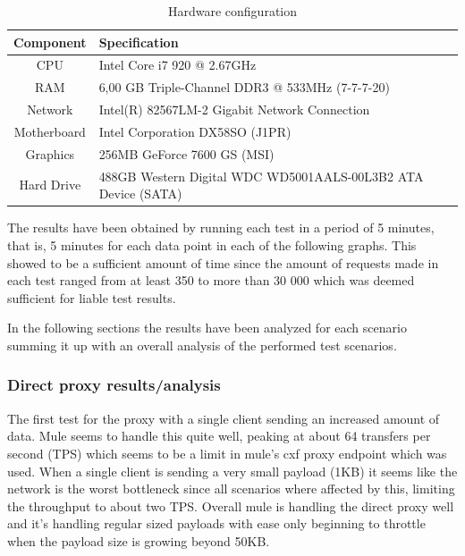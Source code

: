 \begin{table}[H]
	\caption{Hardware configuration}
	\label{table:hw-spec}
	\begin{tabular}{c l}
		Component & Specification \\ 
		\hline
		CPU & Intel Core i7 920 @ 2.67GHz  \\
		RAM &  6,00 GB Triple-Channel DDR3 @ 533MHz (7-7-7-20) \\
		Network &  Intel(R) 82567LM-2 Gigabit Network Connection \\
		Motherboard &  Intel Corporation DX58SO (J1PR) \\
		Graphics &  256MB GeForce 7600 GS (MSI) \\
		Hard Drive &  488GB Western Digital WDC WD5001AALS-00L3B2 ATA Device (SATA) \\
		\hline
	\end{tabular} 
\end{table}

The results have been obtained by running each test in a period of 5 minutes, that is, 5 minutes for each data point in each of the following graphs.
This showed to be a sufficient amount of time since the amount of requests made in each test ranged from at least 350 to more than 30 000 which was deemed sufficient for liable test results. 

In the following sections the results have been analyzed for each scenario summing it up with an overall analysis of the performed test scenarios.

\subsubsection{Direct proxy results/analysis}

The first test for the proxy with a single client sending an increased amount of data. Mule seems to handle this quite well, peaking at about 64 transfers per second (TPS) which seems to be a limit in mule's cxf proxy endpoint which was used. When a single client is sending a very small payload (1KB) it seems like the network is the worst bottleneck since all scenarios where affected by this, limiting the throughput to about two TPS. Overall mule is handling the direct proxy well and it's handling regular sized payloads with ease only beginning to throttle when the payload size is growing beyond 50KB.

